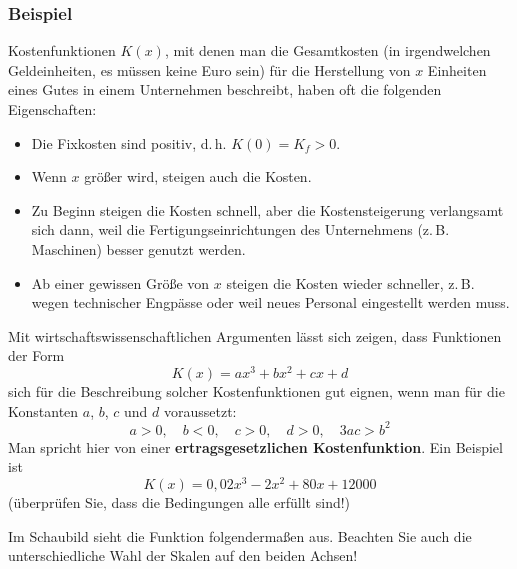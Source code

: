 \subsubsection{Beispiel}

Kostenfunktionen $K(x)$, mit denen man die Gesamtkosten (in irgendwelchen Geldeinheiten, es müssen keine Euro sein) für die Herstellung von $x$ Einheiten eines Gutes in einem Unternehmen beschreibt, haben oft die folgenden Eigenschaften:
\begin{itemize}
  \item Die Fixkosten sind positiv, d.\,h. $K(0) = K_f > 0$.
  \item Wenn $x$ größer wird, steigen auch die Kosten.
  \item Zu Beginn steigen die Kosten schnell, aber die Kostensteigerung verlangsamt sich dann, weil die Fertigungseinrichtungen des Unternehmens (z.\,B. Maschinen) besser genutzt werden.
  \item Ab einer gewissen Größe von $x$ steigen die Kosten wieder schneller, z.\,B. wegen technischer Engpässe oder weil neues Personal eingestellt werden muss.
\end{itemize}

Mit wirtschaftswissenschaftlichen Argumenten lässt sich zeigen, dass Funktionen der Form
\[ K(x) = a x^3 + b x^2 + c x + d \]
sich für die Beschreibung solcher Kostenfunktionen gut eignen, wenn man für die Konstanten $a$, $b$, $c$ und $d$ voraussetzt:
\[ a > 0, \quad b < 0, \quad c > 0, \quad d > 0, \quad 3ac > b^2 \]
Man spricht hier von einer \textbf{ertragsgesetzlichen Kostenfunktion}. Ein Beispiel ist
\[ K(x) = 0{,}02 x^3 - 2 x^2 + 80 x + 12000 \]
(überprüfen Sie, dass die Bedingungen alle erfüllt sind!)

Im Schaubild sieht die Funktion folgendermaßen aus. Beachten Sie auch die unterschiedliche Wahl der Skalen auf den beiden Achsen!

\begin{center}
\end{center}
\beispielende

